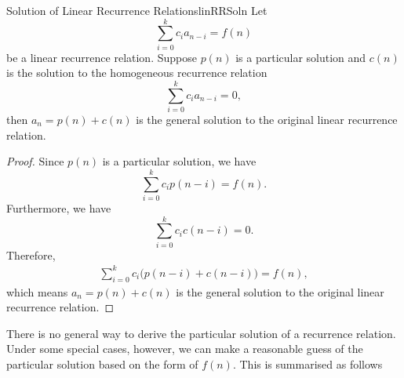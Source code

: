 \documentclass[math]{amznotes}
\theoremstyle{remark}
\newcommand{\0}{\mathbf{0}}
\newcommand{\1}{\mathbf{1}}
\begin{document}
\begin{thmbox}{Solution of Linear Recurrence Relations}{linRRSoln}
    Let
    \begin{equation*}
        \sum_{i = 0}^{k}c_ia_{n - i} = f(n)
    \end{equation*}
    be a linear recurrence relation. Suppose $p(n)$ is a particular solution and $c(n)$ is the solution to the homogeneous recurrence relation
    \begin{equation*}
        \sum_{i = 0}^{k}c_ia_{n - i} = 0,
    \end{equation*}
    then $a_n = p(n) + c(n)$ is the general solution to the original linear recurrence relation.
    \tcblower
    \begin{proof}
        Since $p(n)$ is a particular solution, we have 
        \begin{equation*}
            \sum_{i = 0}^{k}c_ip(n - i) = f(n).
        \end{equation*}
        Furthermore, we have
        \begin{equation*}
            \sum_{i = 0}^{k}c_ic(n - i) = 0.
        \end{equation*}
        Therefore,
        \begin{align*}
            \sum_{i = 0}^{k}c_i\bigl(p(n - i) + c(n - i)\bigr) = f(n),
        \end{align*}
        which means $a_n = p(n) + c(n)$ is the general solution to the original linear recurrence relation.
    \end{proof}
\end{thmbox}
There is no general way to derive the particular solution of a recurrence relation. Under some special cases, however, we can make a reasonable guess of the particular solution based on the form of $f(n)$. This is summarised as follows
\end{document}

